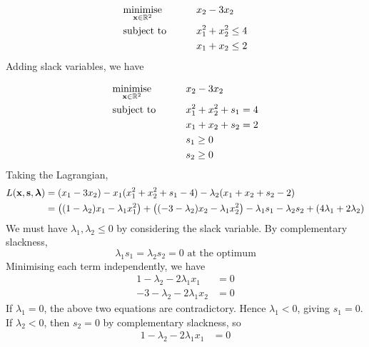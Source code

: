 \begin{example}
	\begin{alignat*}{2}
		 & \underset{\vb x \in \mathbb R^2}{\text{minimise}} & \qquad & x_2 - 3x_2           \\
		 & \text{subject to}                                 &        & x_1^2 + x_2^2 \leq 4 \\
		 &                                                   &        & x_1 + x_2 \leq 2
	\end{alignat*}
	Adding slack variables, we have

	\begin{alignat*}{2}
		 & \underset{\vb x \in \mathbb R^2}{\text{minimise}} & \qquad & x_2 - 3x_2              \\
		 & \text{subject to}                                 &        & x_1^2 + x_2^2 + s_1 = 4 \\
		 &                                                   &        & x_1 + x_2 + s_2 = 2     \\
		 &                                                   &        & s_1 \geq 0              \\
		 &                                                   &        & s_2 \geq 0
	\end{alignat*}
	Taking the Lagrangian,
	\begin{align*}
		L(\vb x, \vb s, \bm \lambda) & = (x_1 - 3x_2) - x_1(x_1^2 + x_2^2 + s_1 - 4) - \lambda_2(x_1 + x_2 + s_2 - 2)                                                                       \\
		                             & = \qty((1 - \lambda_2)x_1 - \lambda_1 x_1^2) + \qty((-3-\lambda_2)x_2 - \lambda_1 x_2^2) - \lambda_1 s_1 - \lambda_2 s_2 + (4\lambda_1 + 2\lambda_2)
	\end{align*}
	We must have \(\lambda_1, \lambda_2 \leq 0\) by considering the slack variable.
	By complementary slackness,
	\[
		\lambda_1 s_1 = \lambda_2 s_2 = 0 \text{ at the optimum}
	\]
	Minimising each term independently, we have
	\begin{align*}
		1 - \lambda_2 - 2\lambda_1 x_1 & = 0 \\
		-3-\lambda_2 - 2\lambda_1 x_2  & = 0
	\end{align*}
	If \(\lambda_1 = 0\), the above two equations are contradictory.
	Hence \(\lambda_1 < 0\), giving \(s_1 = 0\).
	If \(\lambda_2 < 0\), then \(s_2 = 0\) by complementary slackness, so
	\begin{align*}
		1 - \lambda_2 - 2\lambda_1 x_1 & = 0 \\

\end{align*}
\end{example}
